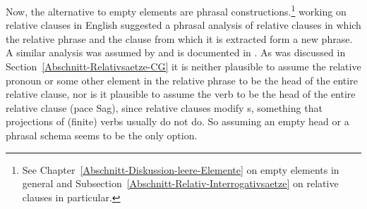Now, the alternative to empty elements are phrasal constructions.\footnote{%
See Chapter~\ref{Abschnitt-Diskussion-leere-Elemente} on empty elements in general and
Subsection~\ref{Abschnitt-Relativ-Interrogativsaetze} on relative clauses in particular.
} \cite{Sag97a} working on relative clauses in
English suggested a phrasal analysis of relative clauses in which the relative phrase and the clause
from which it is extracted form a new phrase. A similar analysis was assumed by
\citet{Babel} and is documented in . As was discussed in Section~\ref{Abschnitt-Relativsaetze-CG} it is
neither plausible to assume the relative pronoun or some other element in the relative phrase to be the
head of the entire relative clause, nor is it plausible to assume the verb to be the head of the entire
relative clause (pace Sag), since relative clauses modify \nbar{}s, something that projections
of (finite) verbs usually do not do. 
So assuming an empty head or a phrasal schema seems to be the
only option.


